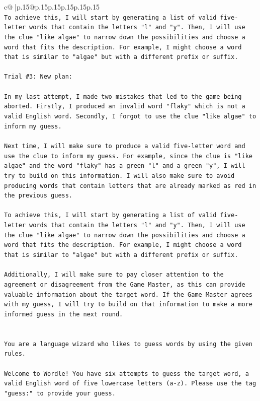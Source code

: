 \documentclass{article}
\begin{document}
{\begin{supertabular}{c@{$\;$}|p{.15\linewidth}@{}p{.15\linewidth}p{.15\linewidth}p{.15\linewidth}p{.15\linewidth}p{.15\linewidth}}
{{{\\ 
\texttt{To achieve this, I will start by generating a list of valid five{-}letter words that contain the letters "l" and "y". Then, I will use the clue "like algae" to narrow down the possibilities and choose a word that fits the description. For example, I might choose a word that is similar to "algae" but with a different prefix or suffix.} \\
\\ 
\texttt{Trial \#3: New plan: } \\
\\ 
\texttt{In my last attempt, I made two mistakes that led to the game being aborted. Firstly, I produced an invalid word "flaky" which is not a valid English word. Secondly, I forgot to use the clue "like algae" to inform my guess. } \\
\\ 
\texttt{Next time, I will make sure to produce a valid five{-}letter word and use the clue to inform my guess. For example, since the clue is "like algae" and the word "flaky" has a green "l" and a green "y", I will try to build on this information. I will also make sure to avoid producing words that contain letters that are already marked as red in the previous guess. } \\
\\ 
\texttt{To achieve this, I will start by generating a list of valid five{-}letter words that contain the letters "l" and "y". Then, I will use the clue "like algae" to narrow down the possibilities and choose a word that fits the description. For example, I might choose a word that is similar to "algae" but with a different prefix or suffix. } \\
\\ 
\texttt{Additionally, I will make sure to pay closer attention to the agreement or disagreement from the Game Master, as this can provide valuable information about the target word. If the Game Master agrees with my guess, I will try to build on that information to make a more informed guess in the next round.} \\
\\ 
\\ 
\texttt{You are a language wizard who likes to guess words by using the given rules.} \\
\\ 
\texttt{Welcome to Wordle! You have six attempts to guess the target word, a valid English word of five lowercase letters (a{-}z). Please use the tag "guess:" to provide your guess.} \\
}}}
\end{supertabular}}
\end{document}
